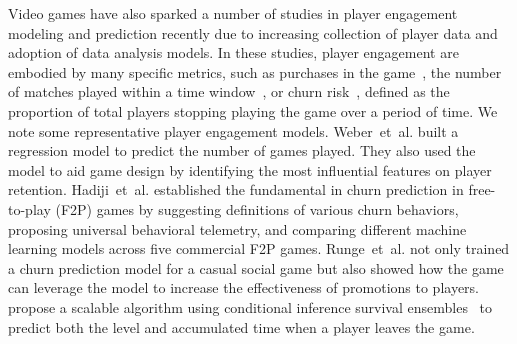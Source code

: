 Video games have also sparked a number of studies in player engagement modeling and prediction recently due to increasing collection of player data and adoption of data analysis models. In these studies, player engagement are embodied by many specific metrics, such as purchases in the game~\cite{xie2015predicting,sifa2015predicting}, the number of matches played within a time window~\cite{xue2017dynamic,weber2011modeling}, or churn risk~\cite{hadiji2014predicting,harrison2012players}, defined as the proportion of total players stopping playing the game over a period of time. We note some representative player engagement models. Weber~et~al.\! \cite{weber2011modeling} built a regression model to predict the number of games played. They also used the model to aid game design by identifying the most influential features on player retention. Hadiji~et~al.\! \cite{hadiji2014predicting} established the fundamental in churn prediction in free-to-play (F2P) games by suggesting definitions of various churn behaviors, proposing universal behavioral telemetry, and comparing different machine learning models across five commercial F2P games. Runge~et~al.\! \cite{runge2014churn} not only trained a churn prediction model for a casual social game but also showed how the game can leverage the model to increase the effectiveness of promotions to players. \cite{bertens2017games} propose a scalable algorithm using conditional inference survival ensembles~\cite{hothorn2006unbiased} to predict both the level and accumulated time when a player leaves the game.




